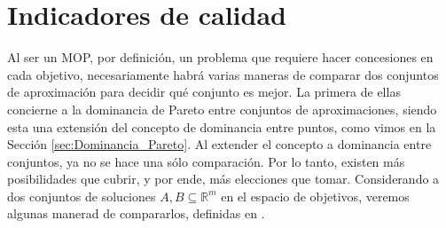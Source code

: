 \section{Indicadores de calidad} \label{sec:QIs}
Al ser un MOP, por definición, un problema que requiere hacer concesiones en cada objetivo, necesariamente habrá varias maneras de comparar dos conjuntos de aproximación para decidir qué conjunto es mejor. La primera de ellas concierne a la dominancia de Pareto entre conjuntos de aproximaciones, siendo esta una extensión del concepto de dominancia entre puntos, como vimos en la Sección \ref{sec:Dominancia_Pareto}. Al extender el concepto a dominancia entre conjuntos, ya no se hace una sólo comparación. Por lo tanto, existen más posibilidades que cubrir, y por ende, más elecciones que tomar. Considerando a dos conjuntos de soluciones $A,B \subseteq \mathbb{R}^m$ en el espacio de objetivos,  veremos algunas manerad de compararlos, definidas en \cite{tesis_mst_guillermo}.





